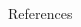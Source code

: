 \documentclass{resume} %
\begin{document}
\begin{paracol}{2}
\begin{rSection}{References}{}
  \end{rSection}

\end{paracol}
\end{document}
